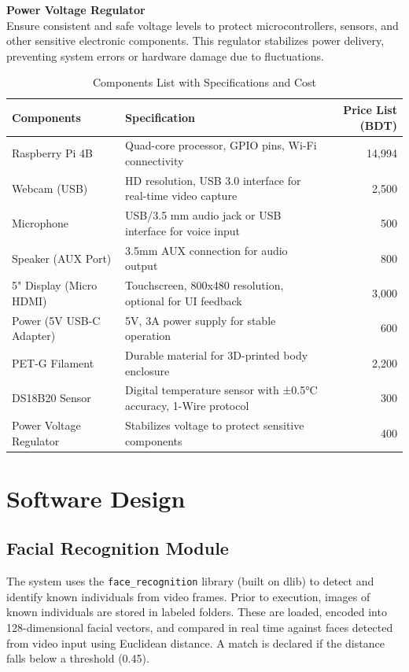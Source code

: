  \textbf{Power Voltage Regulator} \\

Ensure consistent and safe voltage levels to protect microcontrollers, sensors, and other sensitive electronic components. This regulator stabilizes power delivery, preventing system errors or hardware damage due to fluctuations.

\begin{table}[H]
\centering
\caption{Components List with Specifications and Cost}
\begin{tabular}{|l|p{7cm}|r|}
\hline
\textbf{Components} & \textbf{Specification} & \textbf{Price List (BDT)} \\
\hline
Raspberry Pi 4B & Quad-core processor, GPIO pins, Wi-Fi connectivity & 14,994 \\
\hline
Webcam (USB) & HD resolution, USB 3.0 interface for real-time video capture & 2,500 \\
\hline
Microphone & USB/3.5 mm audio jack or USB interface for voice input & 500 \\
\hline
Speaker (AUX Port) & 3.5mm AUX connection for audio output & 800 \\
\hline
5" Display (Micro HDMI) & Touchscreen, 800x480 resolution, optional for UI feedback & 3,000 \\
\hline
Power (5V USB-C Adapter) & 5V, 3A power supply for stable operation & 600 \\
\hline
PET-G Filament & Durable material for 3D-printed body enclosure & 2,200 \\
\hline
DS18B20 Sensor & Digital temperature sensor with ±0.5°C accuracy, 1-Wire protocol & 300 \\
\hline
Power Voltage Regulator & Stabilizes voltage to protect sensitive components & 400 \\
\hline
\end{tabular}
\label{tab:components_cost}
\end{table}

\section{Software Design }

\subsection{Facial Recognition Module}
The system uses the \texttt{face\_recognition} library (built on dlib) to detect and identify known individuals from video frames. Prior to execution, images of known individuals are stored in labeled folders. These are loaded, encoded into 128-dimensional facial vectors, and compared in real time against faces detected from video input using Euclidean distance. A match is declared if the distance falls below a threshold (0.45).

